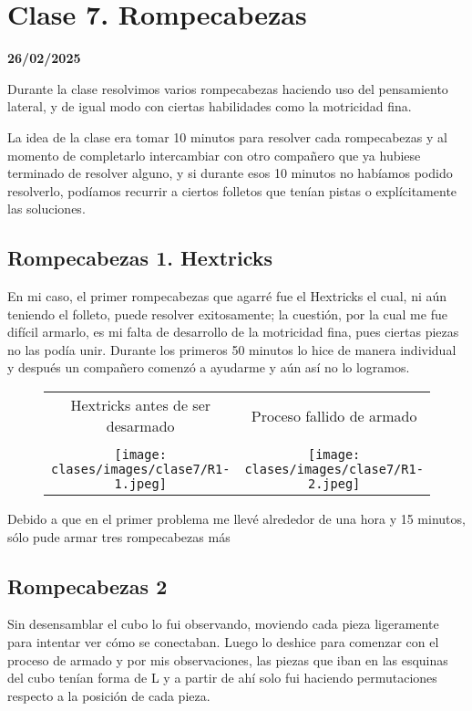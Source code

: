 \chapter{Clase 7. Rompecabezas}
\textbf{26/02/2025}

Durante la clase resolvimos varios rompecabezas haciendo uso del pensamiento lateral, y de igual modo con ciertas habilidades como la motricidad fina. 

La idea de la clase era tomar 10 minutos para resolver cada rompecabezas y al momento de completarlo intercambiar con otro compañero que ya hubiese terminado de resolver alguno, y si durante esos 10 minutos no habíamos podido resolverlo, podíamos recurrir a ciertos folletos que tenían pistas o explícitamente las soluciones. 

\section{Rompecabezas 1. Hextricks}

En mi caso, el primer rompecabezas que agarré fue el Hextricks el cual, ni aún teniendo el folleto, puede resolver exitosamente; la cuestión, por la cual me fue difícil armarlo, es mi falta de desarrollo de la motricidad fina, pues ciertas piezas no las podía unir. Durante los primeros 50 minutos lo hice de manera individual y después un compañero comenzó a ayudarme y aún así no lo logramos.

\begin{figure}[H]
    \begin{tabular}{cc}
        Hextricks antes de ser desarmado & Proceso fallido de armado\\\\
        \texttt{[image: clases/images/clase7/R1-1.jpeg]}&\texttt{[image: clases/images/clase7/R1-2.jpeg]}
    \end{tabular}
    \caption{}
\end{figure}

Debido a que en el primer problema me llevé alrededor de una hora y 15 minutos, sólo pude armar tres rompecabezas más

\section{Rompecabezas 2}

Sin desensamblar el cubo lo fui observando, moviendo cada pieza ligeramente para intentar ver cómo se conectaban. Luego lo deshice para comenzar con el proceso de armado y por mis observaciones, las piezas que iban en las esquinas del cubo tenían forma de L y a partir de ahí solo fui haciendo permutaciones respecto a la posición de cada pieza.

